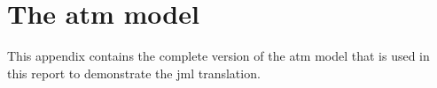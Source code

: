 
\chapter{The \ac{atm} model}
\label{app:atm-model}

This appendix contains the complete version of the \ac{atm} model that
is used in this report to demonstrate the \ac{jml} translation.



